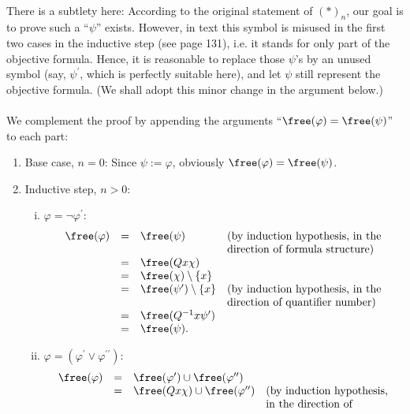 \begin{enumerate}[1.]
\\
There is a subtlety here: According to the original statement of $(*)_n$, our goal is to prove such a ``$\psi$'' exists. However, in text this symbol is misused in the first two cases in the inductive step (see page 131), i.e. it stands for only part of the objective formula. Hence, it is reasonable to replace those $\psi$'s by an unused symbol (say, $\psi^\prime$, which is perfectly suitable here), and let $\psi$ still represent the objective formula. (We shall adopt this minor change in the argument below.)\\
\\
We complement the proof by appending the arguments ``$\free(\varphi) = \free(\psi)$'' to each part:
\begin{enumerate}[(1)]
\item Base case, $n = 0$: Since $\psi := \varphi$, obviously $\free(\varphi) = \free(\psi)$.
\item Inductive step, $n > 0$:
\begin{enumerate}[(i)]
\item $\varphi = \neg \varphi^\prime$:
\[
\begin{array}{llll}
\free(\varphi) & = & \free(\psi) & \mbox{(by induction hypothesis, in the} \\
\              & \ & \           & \mbox{direction of formula structure)} \\
\              & = & \free(Qx \chi) & \  \\
\              & = & \free(\chi) \setminus \{ x \} & \  \\
\              & = & \free(\psi^\prime) \setminus \{ x \} & \mbox{(by induction hypothesis, in the} \\
\              & \ & \           & \mbox{direction of quantifier number)} \\
\              & = & \free(Q^{-1}x \psi^\prime) \\
\              & = & \free(\psi). & \ 
\end{array}
\]
\item $\varphi = (\varphi^\prime \lor \varphi^{\prime\prime})$:
\[
\begin{array}{llll}
\free(\varphi) & = & \free(\varphi^\prime) \cup \free(\varphi^{\prime\prime}) \\
\              & = & \free(Qx \chi) \cup \free(\varphi^{\prime\prime}) & \mbox{(by induction hypothesis,}\\
\              & \ & \                                                 & \mbox{in the direction of} \\

\end{array}\]
\end{enumerate}
\end{enumerate}
\end{enumerate}
